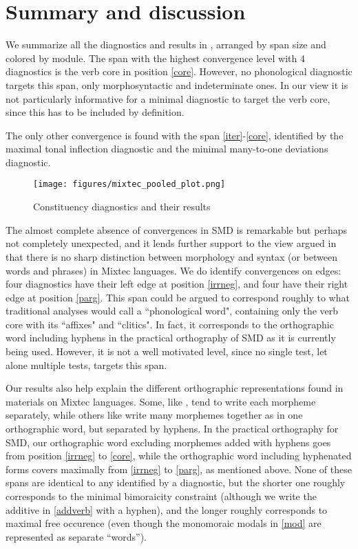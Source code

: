 \documentclass[output=paper]{langscibook}
\begin{document}
\section{Summary and discussion} %
\label{sec:summary}

We summarize all the diagnostics and results in , arranged by span size and colored by module.
The span with the highest convergence level with 4 diagnostics is the verb core in position \ref{core}. However, no phonological diagnostic targets this span, only morphosyntactic and indeterminate ones. 
In our view it is not particularly informative for a minimal diagnostic to target the verb core, since this has to be included by definition. 

The only other convergence is found with the span \ref{iter}-\ref{core}, identified by the maximal tonal inflection diagnostic and the minimal many-to-one deviations diagnostic. 

\begin{figure}
    \centering
    \texttt{[image: figures/mixtec\_pooled\_plot.png]}
    \caption{Constituency diagnostics and their results}
    \label{fig:results}
\end{figure}

The almost complete absence of convergences in SMD is remarkable but perhaps not completely unexpected, and it lends further support to the view argued in \citet{pike1945problem} that there is no sharp distinction between morphology and syntax (or between words and phrases) in Mixtec languages.
We do identify convergences on edges: four diagnostics have their left edge at position \ref{irrneg}, and four have their right edge at position \ref{parg}. 
This span could be argued to correspond roughly to what traditional analyses would call a ``phonological word", containing only the verb core with its ``affixes" and ``clitics". 
In fact, it corresponds to the orthographic word including hyphens in the practical orthography of SMD as it is currently being used. 
However, it is not a well motivated level, since no single test, let alone multiple tests, targets this span.

Our results also help explain the different orthographic representations found in materials on Mixtec languages. Some, like \citet{hollenbach2013gramatica}, tend to write each morpheme separately, while others like \citet{macaulay1996grammar} write many morphemes together as in one orthographic word, but separated by hyphens. 
In the practical orthography for SMD, our orthographic word excluding morphemes added with hyphens goes from position \ref{irrneg} to \ref{core}, while the orthographic word including hyphenated forms covers maximally from \ref{irrneg} to \ref{parg}, as mentioned above.
None of these spans are identical to any identified by a diagnostic, but the shorter one roughly corresponds to the minimal bimoraicity constraint (although we write the additive in \ref{addverb} with a hyphen), and the longer roughly corresponds to maximal free occurence (even though the monomoraic modals in \ref{mod} are represented as separate ``words'').
\end{document}
